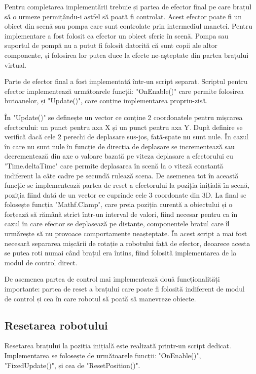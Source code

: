 Pentru completarea implementării trebuie și partea de efector final pe care brațul să o urmeze permițându-i astfel să poată fi controlat. Acest efector poate fi un obiect din scenă sau pompa care sunt controlate prin intermediul manetei. Pentru implementare a fost folosit ca efector un obiect sferic în scenă. Pompa sau suportul de pompă nu a putut fi folosit datorită că sunt copii ale altor componente, și folosirea lor putea duce la efecte ne-așteptate din partea brațului virtual.

Parte de efector final a fost implementată într-un script separat. Scriptul pentru efector implementează următoarele funcții: "OnEnable()" care permite folosirea butoanelor, și  "Update()", care conține implementarea propriu-zisă.

În "Update()" se definește un vector ce conține 2  coordonatele pentru mișcarea efectorului: un punct pentru axa X și un punct pentru axa Y. După definire se verifică dacă cele 2 perechi de deplasare sus-jos, față-spate nu sunt nule. În cazul în care nu sunt nule în funcție de direcția de deplasare se incrementează sau decrementează din axe o valoare bazată pe viteza deplasare a efectorului cu  "Time.deltaTime" care permite deplasarea în scenă la o viteză constantă indiferent la câte cadre pe secundă rulează scena. De asemenea tot în această funcție se implementează partea de reset a efectorului la poziția inițială în scenă, poziția fiind dată de un vector ce cuprinde cele 3 coordonate din 3D.  La final se folosește funcția "Mathf.Clamp", care preia poziția curentă a obiectului și o forțează să rămână strict într-un interval de valori, fiind necesar pentru ca în cazul în care efector se deplasează pe distanțe, componentele brațul care îl urmărește să nu provoace comportamente neașteptate. În acest script a mai fost necesară separarea  mișcării de rotație a  robotului față de efector, deoarece acesta se putea roti numai când brațul era întins, fiind folosită implementarea de la modul de control direct. 

De asemenea partea de control mai implementează două funcționalități importante: partea de reset a brațului care poate fi folosită indiferent de modul de control și cea în care robotul să poată să manevreze obiecte.

\subsection{Resetarea robotului}
Resetarea brațului la poziția inițială este realizată printr-un script dedicat. Implementarea se folosește de următoarele funcții: "OnEnable()", "FixedUpdate()", și cea de "ResetPosition()". 

